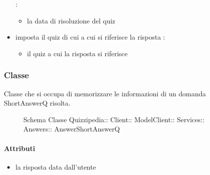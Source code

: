 \begin{itemize}
\newline
{} :
\begin{itemize}
\item {}
\newline
la data di risoluzione del quiz
\end{itemize}
\item {}
\newline
imposta il quiz di cui a cui si riferisce la risposta
\newline
{} :
\begin{itemize}
\item {}
\newline
il quiz a cui la risposta si riferisce
\end{itemize}
\end{itemize}
\subsubsection{Classe }
Classe che si occupa di memorizzare le informazioni di un domanda ShortAnswerQ risolta.
\begin{figure}[H]
\centering
\noindent{}
\caption[Schema Classe AnswerShortAnswerQ]{Schema Classe Quizzipedia:: Client:: ModelClient:: Services:: Answers:: AnswerShortAnswerQ}
\end{figure}
\paragraph{Attributi}
\begin{itemize}
\item {}
\newline
la risposta data dall'utente
\end{itemize}
